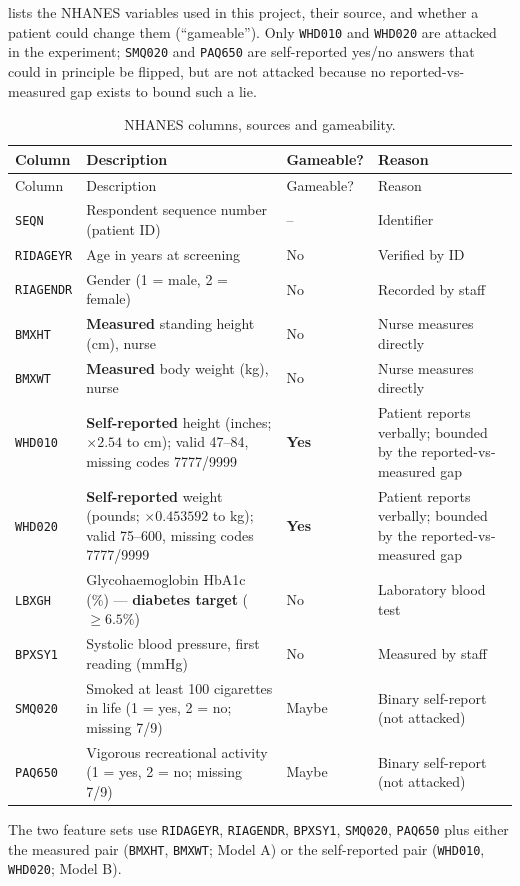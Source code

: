 
 lists the NHANES variables used in this project, their
source, and whether a patient could change them (``gameable'').  Only
\texttt{WHD010} and \texttt{WHD020} are attacked in the experiment;
\texttt{SMQ020} and \texttt{PAQ650} are self-reported yes/no answers that
could in principle be flipped, but are not attacked because no
reported-vs-measured gap exists to bound such a lie.

\begin{longtable}{p{2.1cm}p{6.0cm}p{1.9cm}p{3.5cm}}
  \caption{NHANES columns, sources and gameability.}
  \label{tab:columns}\\
  \toprule
  Column & Description & Gameable? & Reason \\
  \midrule
  \endfirsthead
  \toprule
  Column & Description & Gameable? & Reason \\
  \midrule
  \endhead
  \bottomrule
  \endfoot
  \texttt{SEQN}     & Respondent sequence number (patient ID) & -- & Identifier \\
  \texttt{RIDAGEYR} & Age in years at screening & No & Verified by ID \\
  \texttt{RIAGENDR} & Gender (1 = male, 2 = female) & No & Recorded by staff \\
  \texttt{BMXHT}    & \textbf{Measured} standing height (cm), nurse & No & Nurse measures directly \\
  \texttt{BMXWT}    & \textbf{Measured} body weight (kg), nurse & No & Nurse measures directly \\
  \texttt{WHD010}   & \textbf{Self-reported} height (inches; $\times 2.54$ to cm); valid 47--84, missing codes 7777/9999 & \textbf{Yes} & Patient reports verbally; bounded by the reported-vs-measured gap \\
  \texttt{WHD020}   & \textbf{Self-reported} weight (pounds; $\times 0.453592$ to kg); valid 75--600, missing codes 7777/9999 & \textbf{Yes} & Patient reports verbally; bounded by the reported-vs-measured gap \\
  \texttt{LBXGH}    & Glycohaemoglobin HbA1c (\%) --- \textbf{diabetes target} ($\geq 6.5\%$) & No & Laboratory blood test \\
  \texttt{BPXSY1}   & Systolic blood pressure, first reading (mmHg) & No & Measured by staff \\
  \texttt{SMQ020}   & Smoked at least 100 cigarettes in life (1 = yes, 2 = no; missing 7/9) & Maybe & Binary self-report (not attacked) \\
  \texttt{PAQ650}   & Vigorous recreational activity (1 = yes, 2 = no; missing 7/9) & Maybe & Binary self-report (not attacked) \\
\end{longtable}

The two feature sets use \texttt{RIDAGEYR}, \texttt{RIAGENDR},
\texttt{BPXSY1}, \texttt{SMQ020}, \texttt{PAQ650} plus either the
measured pair (\texttt{BMXHT}, \texttt{BMXWT}; Model A) or the
self-reported pair (\texttt{WHD010}, \texttt{WHD020}; Model B).
